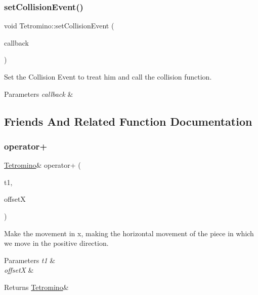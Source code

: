 \subsubsection{\texorpdfstring{set\+Collision\+Event()}{setCollisionEvent()}}
{\footnotesize\ttfamily void Tetromino\+::set\+Collision\+Event (\begin{DoxyParamCaption}\item[{Callback}]{callback }\end{DoxyParamCaption})}



Set the Collision Event to treat him and call the collision function. 


\begin{DoxyParams}{Parameters}
{\em callback} & \\
\hline
\end{DoxyParams}


\subsection{Friends And Related Function Documentation}
\mbox{\label{classTetromino_a6df1d7b28f8b0b41027018105153cc42}} 
\subsubsection{\texorpdfstring{operator+}{operator+}}
{\footnotesize\ttfamily \hyperlink{classTetromino}{Tetromino}\& operator+ (\begin{DoxyParamCaption}\item[{const \hyperlink{classTetromino}{Tetromino} \&}]{t1,  }\item[{const int}]{offsetX }\end{DoxyParamCaption})\hspace{0.3cm}{\ttfamily [friend]}}



Make the movement in x, making the horizontal movement of the piece in which we move in the positive direction. 


\begin{DoxyParams}{Parameters}
{\em t1} & \\
\hline
{\em offsetX} & \\
\hline
\end{DoxyParams}
\begin{DoxyReturn}{Returns}
\hyperlink{classTetromino}{Tetromino}\& 
\end{DoxyReturn}
\mbox{\label{classTetromino_ac382287ca988f74d5a2e517224a1dfd4}} 

